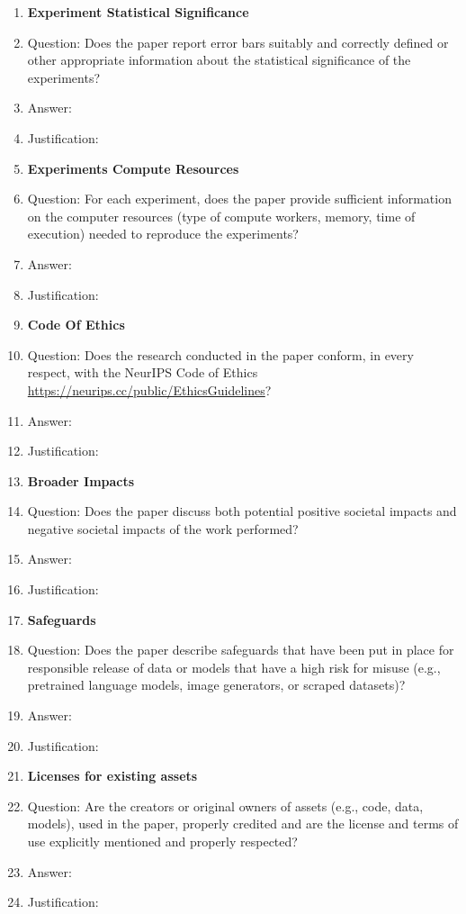 \documentclass{article}
\begin{document}
\begin{enumerate}
\item {\bf Experiment Statistical Significance}
    \item[] Question: Does the paper report error bars suitably and correctly defined or other appropriate information about the statistical significance of the experiments?
    \item[] Answer: \answerTODO{}
    \item[] Justification: \justificationTODO{}

\item {\bf Experiments Compute Resources}
    \item[] Question: For each experiment, does the paper provide sufficient information on the computer resources (type of compute workers, memory, time of execution) needed to reproduce the experiments?
    \item[] Answer: \answerTODO{}
    \item[] Justification: \justificationTODO{}

\item {\bf Code Of Ethics}
    \item[] Question: Does the research conducted in the paper conform, in every respect, with the NeurIPS Code of Ethics \url{https://neurips.cc/public/EthicsGuidelines}?
    \item[] Answer: \answerTODO{}
    \item[] Justification: \justificationTODO{}

\item {\bf Broader Impacts}
    \item[] Question: Does the paper discuss both potential positive societal impacts and negative societal impacts of the work performed?
    \item[] Answer: \answerTODO{}
    \item[] Justification: \justificationTODO{}

\item {\bf Safeguards}
    \item[] Question: Does the paper describe safeguards that have been put in place for responsible release of data or models that have a high risk for misuse (e.g., pretrained language models, image generators, or scraped datasets)?
    \item[] Answer: \answerTODO{}
    \item[] Justification: \justificationTODO{}

\item {\bf Licenses for existing assets}
    \item[] Question: Are the creators or original owners of assets (e.g., code, data, models), used in the paper, properly credited and are the license and terms of use explicitly mentioned and properly respected?
    \item[] Answer: \answerTODO{}
    \item[] Justification: \justificationTODO{}


\end{enumerate}
\end{document}
